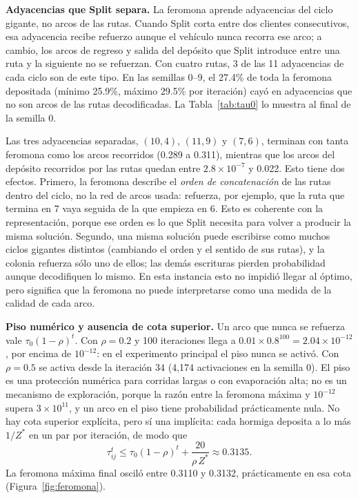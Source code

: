\documentclass[11pt,a4paper]{article}
\numberwithin{equation}{section}
\begin{document}
\textbf{Adyacencias que Split separa.} La feromona aprende adyacencias del ciclo gigante, no arcos de las rutas. Cuando Split corta entre dos clientes consecutivos, esa adyacencia recibe refuerzo aunque el vehículo nunca recorra ese arco; a cambio, los arcos de regreso y salida del depósito que Split introduce entre una ruta y la siguiente no se refuerzan. Con cuatro rutas, 3 de las 11 adyacencias de cada ciclo son de este tipo. En las semillas 0--9, el 27.4\% de toda la feromona depositada (mínimo 25.9\%, máximo 29.5\% por iteración) cayó en adyacencias que no son arcos de las rutas decodificadas. La Tabla~\ref{tab:tau0} lo muestra al final de la semilla 0.

\begin{table}[H]\centering\small
\caption{Feromona final de la semilla 0 en las 11 adyacencias del mejor ciclo gigante \((10,4,5,11,9,8,7,6,2,3)\) y en los arcos del depósito que usan sus rutas sin ser adyacencias del ciclo.}\label{tab:tau0}

\end{table}

Las tres adyacencias separadas, \((10,4)\), \((11,9)\) y \((7,6)\), terminan con tanta feromona como los arcos recorridos (0.289 a 0.311), mientras que los arcos del depósito recorridos por las rutas quedan entre \(2.8\times10^{-7}\) y 0.022. Esto tiene dos efectos. Primero, la feromona describe el \emph{orden de concatenación} de las rutas dentro del ciclo, no la red de arcos usada: refuerza, por ejemplo, que la ruta que termina en 7 vaya seguida de la que empieza en 6. Esto es coherente con la representación, porque ese orden es lo que Split necesita para volver a producir la misma solución. Segundo, una misma solución puede escribirse como muchos ciclos gigantes distintos (cambiando el orden y el sentido de sus rutas), y la colonia refuerza sólo uno de ellos; las demás escrituras pierden probabilidad aunque decodifiquen lo mismo. En esta instancia esto no impidió llegar al óptimo, pero significa que la feromona no puede interpretarse como una medida de la calidad de cada arco.

\textbf{Piso numérico y ausencia de cota superior.} Un arco que nunca se refuerza vale \(\tau_0(1-\rho)^t\). Con \(\rho=0.2\) y 100 iteraciones llega a \(0.01\times0.8^{100}=2.04\times10^{-12}\), por encima de \(10^{-12}\): en el experimento principal el piso nunca se activó. Con \(\rho=0.5\) se activa desde la iteración 34 (4,174 activaciones en la semilla 0). El piso es una protección numérica para corridas largas o con evaporación alta; no es un mecanismo de exploración, porque la razón entre la feromona máxima y \(10^{-12}\) supera \(3\times10^{11}\), y un arco en el piso tiene probabilidad prácticamente nula. No hay cota superior explícita, pero sí una implícita: cada hormiga deposita a lo más \(1/Z^*\) en un par por iteración, de modo que
\begin{equation}\label{eq:cota}
\tau_{ij}^t\le \tau_0(1-\rho)^t+\frac{20}{\rho\,Z^*}\approx 0.3135 .
\end{equation}
La feromona máxima final osciló entre 0.3110 y 0.3132, prácticamente en esa cota (Figura~\ref{fig:feromona}).
\end{document}
